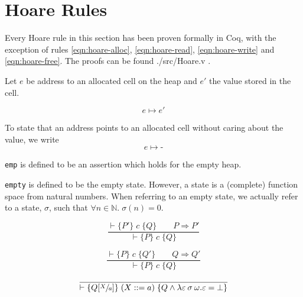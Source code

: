 
\section{Hoare Rules}

Every Hoare rule in this section has been proven formally in Coq, with the exception of rules \ref{eqn:hoare-alloc}, \ref{eqn:hoare-read}, \ref{eqn:hoare-write} and \ref{eqn:hoare-free}. The proofs can be found ./src/Hoare.v .

\begin{defn}

Let $e$ be address to an allocated cell on the heap and $e'$ the value stored in the cell.

\begin{equation}
e \mapsto e'
\end{equation}

To state that an address points to an allocated cell without caring about the value, we write
\begin{equation}
e \mapsto \textbf{-}
\end{equation}

\end{defn}

\begin{defn}
\verb|emp| is defined to be an assertion which holds for the empty heap.
\end{defn}

\begin{defn}
\verb|empty| is defined to be the empty state. However, a state is a (complete) function space from natural numbers. When referring to an empty state, we actually refer to a state, $\sigma$, such that $\forall n \in \mathbb{N}.\; \sigma(n) = 0$.
\end{defn}

\begin{equation}\label{eqn:hoare-cons-pre}
\frac{\vdash\{P'\} \; c \; \{Q\} \qquad P \Rightarrow P'}{\vdash\{P\} \; c \; \{Q\}}
\end{equation}

\begin{equation}\label{eqn:hoare-cons-post}
\frac{\vdash\{P\} \; c \; \{Q'\} \qquad Q \Rightarrow Q'}{\vdash\{P\} \; c \; \{Q\}}
\end{equation}

\begin{equation}\label{eqn:hoare-assign}
\frac{}{\vdash \{Q[\sfrac{X}{a}]\} \; (X ::= a) \; \{Q \wedge \lambda \varepsilon\:\sigma\:\omega. \varepsilon = \bot\}}
\end{equation}

